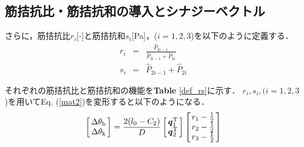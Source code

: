\subsection{筋拮抗比・筋拮抗和の導入とシナジーベクトル}
さらに，筋拮抗比$r_i$[-]と筋拮抗和$s_i$[Pa]，($i=1,2,3$)を以下のように定義する\cite{Ariga2013}．
\begin{eqnarray}
 \label{def_sum}
 r_i&=&\frac{\hat{P}_{2i-1}}{\hat{P}_{2i-1}+\hat{P}_{2i}} \\
 \label{def_ratio}
 s_i&=&\hat{P}_{2i-1}+\hat{P}_{2i}
\end{eqnarray}
%
\begin{table}[t]
 \caption{Definition of the A-A ratio and the A-A sum for artificial muscle system.}
 \begin{center}
 \end{center}
\end{table}
%
それぞれの筋拮抗比と筋拮抗和の機能を{\bf Table} \ref{def_rs}に示す．
$r_i,s_i,(i=1,2,3$)を用いてEq. (\ref{mat2})を変形すると以下のようになる．
\begin{eqnarray}
 \arraycolsep=1.5pt
 \label{mat3}
 \left[
  \begin{array}{c}
   \Delta\theta_{\rm h} \\
   \Delta\theta_{\rm k}
  \end{array}
 \right]=\frac{2(l_0-C_2)}{D}
 \left[
  \begin{array}{c}
   \ve{q}^{\rm T}_1 \\
   \ve{q}^{\rm T}_2
  \end{array}
 \right]
 \left[
  \begin{array}{c}
   r_{1}-\frac{1}{2} \\
   r_{2}-\frac{1}{2} \\
   r_{3}-\frac{1}{2} \\
  \end{array}
 \right]
\end{eqnarray}
